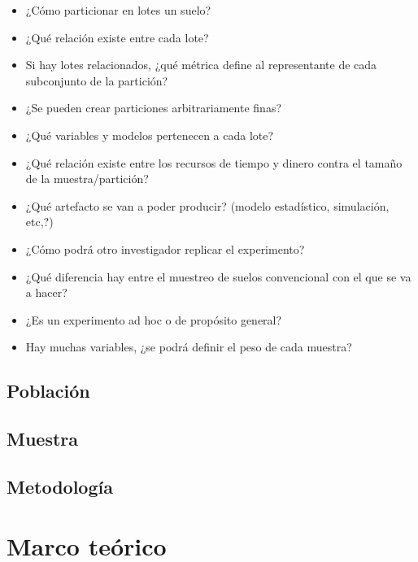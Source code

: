 \documentclass{report}
\begin{document}
\begin{itemize}
    \item ¿Cómo particionar en lotes un suelo?
    
    \item ¿Qué relación existe entre cada lote?
    
    \item Si hay lotes relacionados, ¿qué métrica define al representante de cada subconjunto de la partición?
    
    \item ¿Se pueden crear particiones arbitrariamente finas?
    
    \item ¿Qué variables y modelos pertenecen a cada lote?
    
    \item ¿Qué relación existe entre los recursos de tiempo y dinero contra el tamaño de la muestra/partición?
    
    \item ¿Qué artefacto se van a poder producir? (modelo estadístico, simulación, etc,?)
    
    \item ¿Cómo podrá otro investigador replicar el experimento?
    
    \item ¿Qué diferencia hay entre el muestreo de suelos convencional con el que se va a hacer?
    
    \item ¿Es un experimento ad hoc o de propósito general?
    
    \item Hay muchas variables, ¿se podrá definir el peso de cada muestra?
\end{itemize}


\subsection{Población}


\subsection{Muestra}


\subsection{Metodología}


\section{Marco teórico}
\end{document}
